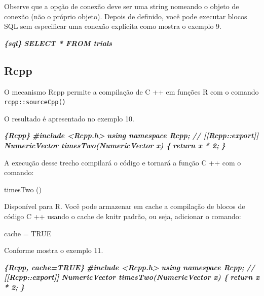 \documentclass[
]{book}
\newenvironment{Shaded}{\begin{snugshade}}{\end{snugshade}}
\newcommand{\InformationTok}[1]{\textcolor[rgb]{0.56,0.35,0.01}{\textbf{\textit{#1}}}}
\begin{document}
Observe que a opção de conexão deve ser uma string nomeando o objeto de conexão (não o próprio objeto). Depois de definido, você pode executar blocos SQL sem especificar uma conexão explícita como mostra o exemplo 9.

\begin{Shaded}
\begin{Highlighting}[]
 \InformationTok{\textasciigrave{}\textasciigrave{}\textasciigrave{}\{sql\}}
\InformationTok{SELECT * FROM trials}
\InformationTok{\textasciigrave{}\textasciigrave{}\textasciigrave{}}
\end{Highlighting}
\end{Shaded}

\hypertarget{rcpp}{%
\subsection{Rcpp}\label{rcpp}}

O mecanismo Rcpp permite a compilação de C ++ em funções R com o comando \texttt{rcpp::sourceCpp()}

O resultado é apresentado no exemplo 10.

\begin{Shaded}
\begin{Highlighting}[]
 \InformationTok{\textasciigrave{}\textasciigrave{}\textasciigrave{}\{Rcpp\}}
\InformationTok{\#include \textless{}Rcpp.h\textgreater{}}
\InformationTok{using namespace Rcpp;}
\InformationTok{// [[Rcpp::export]]}
\InformationTok{NumericVector timesTwo(NumericVector x) \{}
\InformationTok{return x * 2;}
\InformationTok{\}}
\InformationTok{\textasciigrave{}\textasciigrave{}\textasciigrave{}}
\end{Highlighting}
\end{Shaded}

A execução desse trecho compilará o código e tornará a função C ++ com o comando:

timesTwo ()

Disponível para R. Você pode armazenar em cache a compilação de blocos de código C ++ usando o cache de knitr padrão, ou seja, adicionar o comando:

cache = TRUE

Conforme mostra o exemplo 11.

\begin{Shaded}
\begin{Highlighting}[]
 \InformationTok{\textasciigrave{}\textasciigrave{}\textasciigrave{}\{Rcpp, cache=TRUE\}}
\InformationTok{\#include \textless{}Rcpp.h\textgreater{}}
\InformationTok{using namespace Rcpp;}
\InformationTok{// [[Rcpp::export]]}
\InformationTok{NumericVector timesTwo(NumericVector x) \{}
\InformationTok{return x * 2;}
\InformationTok{\}}
\InformationTok{\textasciigrave{}\textasciigrave{}\textasciigrave{}}
\end{Highlighting}
\end{Shaded}
\end{document}
